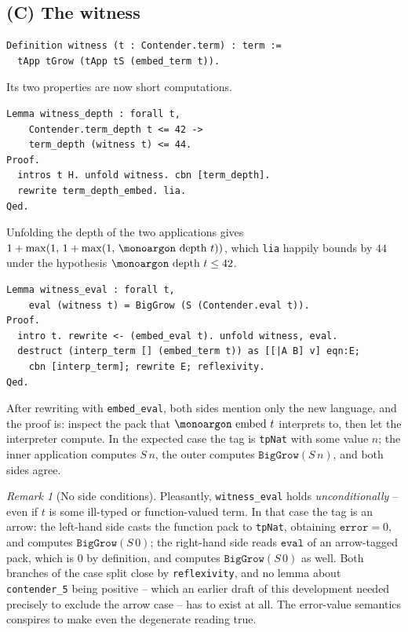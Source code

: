 \documentclass[11pt,a4paper]{article}
\theoremstyle{plain}
\theoremstyle{definition}
\theoremstyle{remark}
\newtheorem{remark}[theorem]{Remark}
\newcommand{\opname}[1]{\mathop{\text{\monoargon #1}}\nolimits}
\newcommand{\depth}{\opname{depth}}
\newcommand{\embed}{\opname{embed}}
\begin{document}
\subsection{(C) The witness}
\label{sec:witness}

\begin{lstlisting}
Definition witness (t : Contender.term) : term :=
  tApp tGrow (tApp tS (embed_term t)).
\end{lstlisting}

Its two properties are now short computations.

\begin{lstlisting}
Lemma witness_depth : forall t,
    Contender.term_depth t <= 42 ->
    term_depth (witness t) <= 44.
Proof.
  intros t H. unfold witness. cbn [term_depth].
  rewrite term_depth_embed. lia.
Qed.
\end{lstlisting}

Unfolding the depth of the two applications gives
$1 + \max(1,\, 1 + \max(1,\, \depth\,t))$, which \texttt{lia} happily
bounds by $44$ under the hypothesis $\depth\,t \leq 42$.

\begin{lstlisting}
Lemma witness_eval : forall t,
    eval (witness t) = BigGrow (S (Contender.eval t)).
Proof.
  intro t. rewrite <- (embed_eval t). unfold witness, eval.
  destruct (interp_term [] (embed_term t)) as [[|A B] v] eqn:E;
    cbn [interp_term]; rewrite E; reflexivity.
Qed.
\end{lstlisting}

After rewriting with \texttt{embed\_eval}, both sides mention only the
new language, and the proof is: inspect the pack that
$\embed\,t$ interprets to, then let the interpreter compute.  In
the expected case the tag is \texttt{tpNat} with some value $n$; the
inner application computes $S\,n$, the outer computes
$\texttt{BigGrow}(S\,n)$, and both sides agree.

\begin{remark}[No side conditions]
Pleasantly, \texttt{witness\_eval} holds \emph{unconditionally} --
even if $t$ is some ill-typed or function-valued term.  In that case
the tag is an arrow: the left-hand side casts the function pack to
\texttt{tpNat}, obtaining $\texttt{error} = 0$, and computes
$\texttt{BigGrow}(S\,0)$; the right-hand side reads
$\texttt{eval}$ of an arrow-tagged pack, which is $0$ by definition,
and computes $\texttt{BigGrow}(S\,0)$ as well.  Both branches of the
case split close by \texttt{reflexivity}, and no lemma about
\texttt{contender\_5} being positive -- which an earlier draft of this
development needed precisely to exclude the arrow case -- has to
exist at all.  The error-value semantics conspires to make even the
degenerate reading true.
\end{remark}
\end{document}
